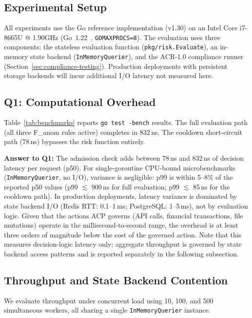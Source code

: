 \documentclass[11pt]{article}
\theoremstyle{definition}
\begin{document}
\subsection{Experimental Setup}

All experiments use the Go reference implementation (v1.30) on an Intel Core i7-8665U @ 1.90GHz (Go~1.22~\cite{go-language}, \texttt{GOMAXPROCS=8}).
The evaluation uses three components:
the stateless evaluation function (\texttt{pkg/risk.Evaluate}),
an in-memory state backend (\texttt{InMemoryQuerier}),
and the ACR-1.0 compliance runner (Section~\ref{sec:compliance-testing}).
Production deployments with persistent storage backends will incur additional I/O latency not measured here.

\subsection{Q1: Computational Overhead}

Table~\ref{tab:benchmarks} reports \texttt{go test -bench} results.
The full evaluation path (all three F\_anom rules active) completes in 832\,ns.
The cooldown short-circuit path (78\,ns) bypasses the risk function entirely.

\noindent\textbf{Answer to Q1:}
The admission check adds between 78\,ns and 832\,ns of decision latency per request (p50).
For single-goroutine CPU-bound microbenchmarks (\texttt{InMemoryQuerier}, no I/O),
variance is negligible: p99 is within 5--8\% of the reported p50 values
(p99 $\lesssim$ 900\,ns for full evaluation; p99 $\lesssim$ 85\,ns for the cooldown path).
In production deployments, latency variance is dominated by state backend I/O
(Redis RTT: 0.1--1\,ms; PostgreSQL: 1--5\,ms), not by evaluation logic.
Given that the actions ACP governs (API calls, financial transactions, file mutations)
operate in the millisecond-to-second range, the overhead is at least three orders of
magnitude below the cost of the governed action.
Note that this measures decision-logic latency only; aggregate throughput is governed
by state backend access patterns and is reported separately in the following subsection.

\subsection{Throughput and State Backend Contention}

We evaluate throughput under concurrent load using 10, 100, and 500 simultaneous workers,
all sharing a single \texttt{InMemoryQuerier} instance.
\end{document}
